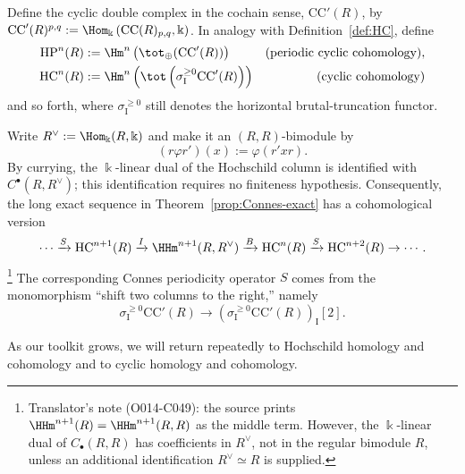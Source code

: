 \begin{remark}
	Define the cyclic double complex in the cochain sense,
	$\mathrm{CC}'(R)$, by
	$\mathrm{CC}'(R)^{p,q}:=
	\Hom_{\Bbbk}\left(\mathrm{CC}(R)_{p,q},\Bbbk\right)$. In analogy with
	Definition~\ref{def:HC}, define
	\begin{align*}
		\mathrm{HP}^n(R)
		&:=\Hm^n\left(\tot_{\oplus}(\mathrm{CC}'(R))\right)
		&\text{(periodic cyclic cohomology)},\\
		\mathrm{HC}^n(R)
		&:=\Hm^n\left(
		\tot\left(\sigma_{\mathrm{I}}^{\geq0}\mathrm{CC}'(R)\right)\right)
		&\text{(cyclic cohomology)}
	\end{align*}
	and so forth, where $\sigma_{\mathrm{I}}^{\geq0}$ still denotes the
	horizontal brutal-truncation functor.

	Write $R^\vee:=\Hom_{\Bbbk}(R,\Bbbk)$ and make it an $(R,R)$-bimodule by
	\[ (r\varphi r')(x):=\varphi(r'xr). \]
	By currying, the $\Bbbk$-linear dual of the Hochschild column is identified
	with $C^\bullet(R,R^\vee)$; this identification requires no finiteness
	hypothesis. Consequently, the long exact sequence in
	Theorem~\ref{prop:Connes-exact} has a cohomological version
	\[ \cdots \xrightarrow{S} \mathrm{HC}^{n+1}(R)
		\xrightarrow{I} \HHm^{n+1}(R,R^\vee) \xrightarrow{B}
		\mathrm{HC}^n(R) \xrightarrow{S} \mathrm{HC}^{n+2}(R) \to \cdots. \]
	\footnote{Translator's note (O014-C049): the source prints
	$\HHm^{n+1}(R)=\HHm^{n+1}(R,R)$ as the middle term. However, the
	$\Bbbk$-linear dual of $C_\bullet(R,R)$ has coefficients in $R^\vee$,
	not in the regular bimodule $R$, unless an additional identification
	$R^\vee\simeq R$ is supplied.}
	The corresponding Connes periodicity operator $S$ comes from the
	monomorphism ``shift two columns to the right,'' namely
	\[ \sigma_{\mathrm{I}}^{\geq0}\mathrm{CC}'(R)
		\to\left(\sigma_{\mathrm{I}}^{\geq0}\mathrm{CC}'(R)\right)_{\mathrm{I}}[2]. \]
\end{remark}

As our toolkit grows, we will return repeatedly to Hochschild homology and
cohomology and to cyclic homology and cohomology.
